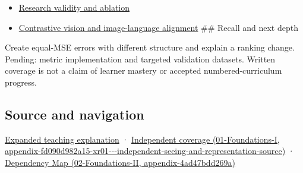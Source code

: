 \begin{itemize}
\item
  \hyperref[appendix-65788587ef78]{Research validity and ablation}
\item
  \hyperref[appendix-772f1fd96148]{Contrastive vision and image-language alignment} \#\# Recall and next depth
\end{itemize}

Create equal-MSE errors with different structure and explain a ranking change. Pending: metric implementation and targeted validation datasets. Written coverage is not a claim of learner mastery or accepted numbered-curriculum progress.

\subsection{Source and navigation}\label{appendix-b2c1846508bf-source-and-navigation}

\hyperref[04-visual-computing-ii-ch042-quality-numbers-need-a-question-they-can-actually-answer]{Expanded teaching explanation} · \href{../01-Foundations-I/main.pdf\#nameddest=appendix-fd090d982a15-xr01---independent-seeing-and-representation-source}{Independent coverage (01-Foundations-I, appendix-fd090d982a15-xr01-\/-\/-independent-seeing-and-representation-source)} · \href{../02-Foundations-II/main.pdf\#nameddest=appendix-4ad47bdd269a}{Dependency Map (02-Foundations-II, appendix-4ad47bdd269a)}
